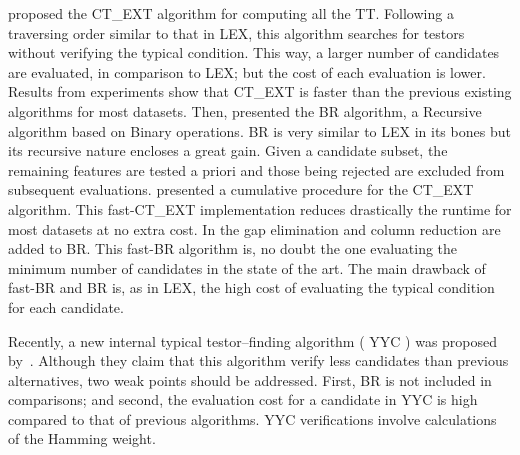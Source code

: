 \documentclass[authoryear,11pt]{elsarticle}
\makeatletter
\newcommand{\setword}[2]{%
  \phantomsection
  #1\def\@currentlabel{\unexpanded{#1}}\label{#2}%
}
\makeatother
\begin{document}
  \cite{Sanchez07} proposed the \setword{CT\_EXT}{CTEXT} algorithm for computing all the
  TT. Following a traversing order similar to that in LEX, this algorithm searches for
  testors without verifying the typical condition. This way, a larger number of candidates are 
  evaluated, in comparison to LEX; but the cost of each evaluation is lower. Results from experiments
  show that CT\_EXT is faster than the previous existing algorithms for most datasets. Then, \cite{Lias09}
  presented the \setword{BR}{BR} algorithm, a Recursive algorithm based on 
  Binary operations. BR is very similar to LEX in its bones but its recursive nature encloses a great
  gain. Given a candidate subset, the remaining features are tested a priori and those being rejected are
  excluded from subsequent evaluations. \cite{Sanchez10} presented a cumulative
  procedure for the CT\_EXT algorithm. This fast-CT\_EXT implementation reduces drastically the runtime
  for most datasets at no extra cost. In \citep{Lias13} the
  gap elimination and column reduction are added to BR. This fast-BR algorithm is, no doubt the one 
  evaluating the minimum number of candidates in the state of the art. The main drawback of fast-BR and 
  BR is, as in LEX, the high cost of evaluating the typical condition for each candidate. 
 
  Recently, a new internal typical testor--finding algorithm (\setword{YYC}{YYC}) was proposed by~\cite{Alba14}. Although 
  they claim that this algorithm verify less candidates than previous alternatives, two weak points should
  be addressed. First, BR is not included in comparisons; and second, the evaluation cost for a candidate
  in YYC is high compared to that of previous algorithms. YYC verifications involve calculations of the 
  Hamming weight.
\end{document}
